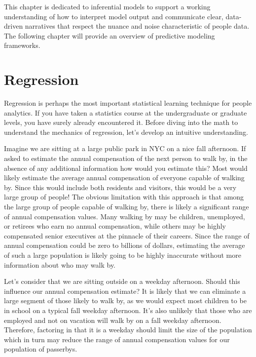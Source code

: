 \documentclass[]{book}
\begin{document}
This chapter is dedicated to inferential models to support a working understanding of how to interpret model output and communicate clear, data-driven narratives that respect the nuance and noise characteristic of people data. The following chapter will provide an overview of predictive modeling frameworks.

\hypertarget{regression}{%
\section{Regression}\label{regression}}

Regression is perhaps the most important statistical learning technique for people analytics. If you have taken a statistics course at the undergraduate or graduate levels, you have surely already encountered it. Before diving into the math to understand the mechanics of regression, let's develop an intuitive understanding.

Imagine we are sitting at a large public park in NYC on a nice fall afternoon. If asked to estimate the annual compensation of the next person to walk by, in the absence of any additional information how would you estimate this? Most would likely estimate the average annual compensation of everyone capable of walking by. Since this would include both residents and visitors, this would be a very large group of people! The obvious limitation with this approach is that among the large group of people capable of walking by, there is likely a significant range of annual compensation values. Many walking by may be children, unemployed, or retirees who earn no annual compensation, while others may be highly compensated senior executives at the pinnacle of their careers. Since the range of annual compensation could be zero to billions of dollars, estimating the average of such a large population is likely going to be highly inaccurate without more information about who may walk by.

Let's consider that we are sitting outside on a weekday afternoon. Should this influence our annual compensation estimate? It is likely that we can eliminate a large segment of those likely to walk by, as we would expect most children to be in school on a typical fall weekday afternoon. It's also unlikely that those who are employed and not on vacation will walk by on a fall weekday afternoon. Therefore, factoring in that it is a weekday should limit the size of the population which in turn may reduce the range of annual compensation values for our population of passerbys.
\end{document}
